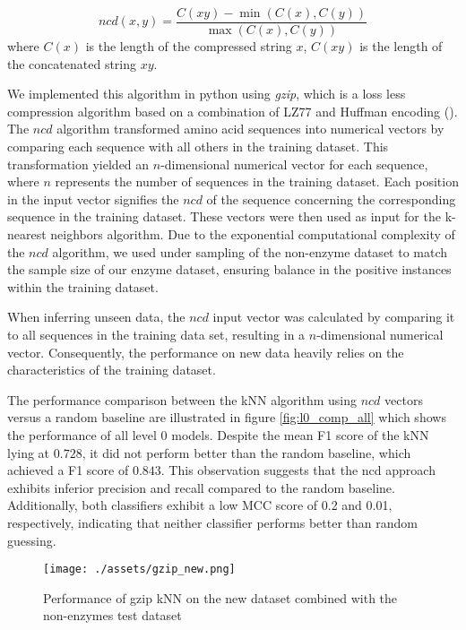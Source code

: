 \documentclass{bioinfo}
\begin{document}
\begin{equation}
	ncd(x,y) = \frac{C(xy)-\min(C(x),C(y))}{\max(C(x),C(y))}
\end{equation}
where $C(x)$ is the length of the compressed string $x$, $C(xy)$ is the length of the concatenated string $xy$. 

We implemented this algorithm in python using \textit{gzip}, which is a loss less compression algorithm based on a combination of LZ77 and Huffman encoding (\cite{Rigler2007}).
The $ncd$ algorithm transformed amino acid sequences into numerical vectors by comparing each sequence with all others in the training dataset.
This transformation yielded an $n$-dimensional numerical vector for each sequence, where $n$ represents the number of sequences in the training dataset.
Each position in the input vector signifies the $ncd$ of the sequence concerning the corresponding sequence in the training dataset. 
These vectors were then used as input for the k-nearest neighbors algorithm.
Due to the exponential computational complexity of the $ncd$ algorithm, we used under sampling of the non-enzyme dataset to match the sample size of our enzyme dataset,
ensuring balance in the positive instances within the training dataset. 

When inferring unseen data, the $ncd$ input vector was calculated by comparing it to all sequences in 
the training data set, resulting in a $n$-dimensional numerical vector.
Consequently, the performance on new data heavily relies on the characteristics of the training dataset.

The performance comparison between the kNN algorithm using $ncd$ vectors versus a random baseline are illustrated in figure \ref{fig:l0_comp_all}
which shows the performance of all level 0 models.
Despite the mean F1 score of the kNN lying at $0.728$, it did not perform better than the random baseline, which 
achieved a F1 score of $0.843$.
This observation suggests that the ncd approach exhibits inferior precision and recall compared to the random baseline. 
Additionally, both classifiers exhibit a low MCC score of 0.2 and 0.01, respectively, indicating that neither classifier performs better than random guessing.

\begin{figure}[!tb]
	\texttt{[image: ./assets/gzip\_new.png]}
	\caption{Performance of gzip kNN on the new dataset combined with the non-enzymes test dataset}
	\label{fig:l0_gzip_score}
\end{figure}
\end{document}
